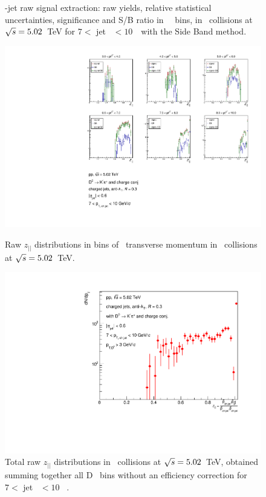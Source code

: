 \begin{figure}[bth]
\begin{minipage}{.4\textwidth}
\caption{%
\Dzero-jet raw signal extraction: raw yields, relative statistical uncertainties, significance and S/B ratio in \Dzero\ \pt\ bins, in \pp\ collisions at $\sqrt{s}=5.02$~TeV for $7<$ jet \pt\ $<10$~\GeVc\ with the Side Band method.
}
\label{fig:eq_pp_signalParams_7_10_R3}
\end{minipage}
\end{figure}
\begin{figure}[bth]
\centering
\begin{minipage}{.65\textwidth}
  \centering
\includegraphics[width=\textwidth]{pp_2sig/R3_jetbin_7_10/jetRawSpectrum_pTD3}
\caption{Raw $z_{||}$ distributions in bins of \Dzero\ transverse momentum in \pp\ collisions at $\sqrt{s}=5.02$~TeV.}
\label{fig:eq_pp_signBkgJet_Dzero_7_10_R3}
\end{minipage}%
\begin{minipage}{.4\textwidth}
  \centering
\includegraphics[width=\textwidth]{pp_2sig/R3_jetbin_7_10/jetPtSpectrum_SB_pTD3}
\caption{Total raw $z_{||}$ distributions in \pp\ collisions at $\sqrt{s}=5.02$~TeV, obtained summing together all D \pt\ bins without an efficiency correction for $7<$ jet \pt\ $<10$ \GeVc\ .
}
\label{fig:eq_pp_signBkgJet_tot_7_10_R3}
\end{minipage}
\end{figure}

